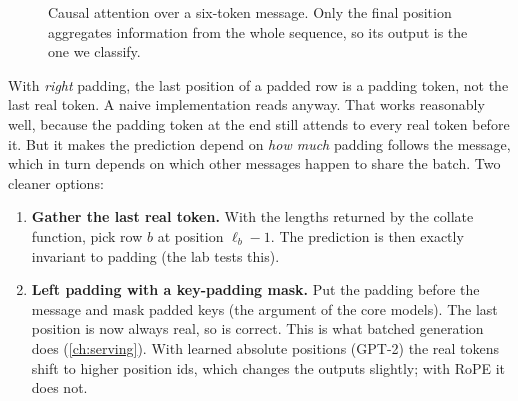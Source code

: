 \begin{figure}[ht]
\centering
{}
\caption{Causal attention over a six-token message. Only the final position aggregates
information from the whole sequence, so its output is the one we classify.}
\label{fig:classify:lasttoken}
\end{figure}

With \emph{right} padding, the last position of a padded row is a padding token, not the
last real token. A naive implementation reads  anyway. That works
reasonably well, because the padding token at the end still attends to every real
token before it. But it makes the prediction depend on \emph{how much} padding follows
the message, which in turn depends on which other messages happen to share the batch.
Two cleaner options:

\begin{enumerate}
\item \textbf{Gather the last real token.} With the lengths returned by the collate
function, pick row $b$ at position $\ell_b - 1$. The prediction is then exactly
invariant to padding (the lab tests this).
\item \textbf{Left padding with a key-padding mask.} Put the padding before the message
and mask padded keys (the  argument of the core models). The last
position is now always real, so  is correct. This is what batched
generation does (\cref{ch:serving}). With learned absolute positions (GPT-2) the real
tokens shift to higher position ids, which changes the outputs slightly; with RoPE it
does not.
\end{enumerate}

